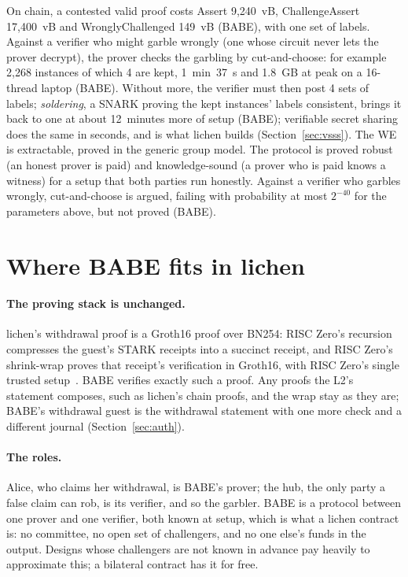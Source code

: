 \documentclass[11pt]{article}
\begin{document}
On chain, a contested valid proof costs Assert 9,240~vB, ChallengeAssert
17,400~vB and WronglyChallenged 149~vB (BABE), with one set of labels.
Against a verifier who might garble wrongly (one whose circuit never lets
the prover decrypt), the prover checks the garbling by cut-and-choose:
for example 2,268 instances of which 4 are kept, 1~min~37~s and 1.8~GB at
peak on a 16-thread laptop (BABE). Without more, the verifier must then
post 4 sets of labels; \emph{soldering}, a SNARK proving the kept
instances' labels consistent, brings it back to one at about 12~minutes
more of setup (BABE); verifiable secret sharing does the same in seconds,
and is what lichen builds (Section~\ref{sec:vsss}). The WE is
extractable, proved in the generic group model. The protocol is proved
robust (an honest prover is paid) and knowledge-sound (a prover who is
paid knows a witness) for a setup that both parties run honestly.
Against a verifier who garbles wrongly, cut-and-choose is argued,
failing with probability at most $2^{-40}$ for the parameters above, but
not proved (BABE).

\section{Where BABE fits in lichen}
\label{sec:fit}

\paragraph{The proving stack is unchanged.} lichen's withdrawal proof is
a Groth16 proof over BN254: RISC Zero's recursion compresses the guest's
STARK receipts into a succinct receipt, and RISC Zero's shrink-wrap
proves that receipt's verification in Groth16, with RISC Zero's single
trusted setup~\cite{risc0}. BABE verifies exactly such a proof. Any proofs
the L2's statement composes, such as lichen's chain proofs, and the wrap
stay as they are; BABE's withdrawal guest is the withdrawal statement
with one more check and a different journal (Section~\ref{sec:auth}).

\paragraph{The roles.} Alice, who claims her withdrawal, is BABE's
prover; the hub, the only party a false claim can rob, is its verifier,
and so the garbler. BABE is a protocol between one prover and one
verifier, both known at setup, which is what a lichen contract is: no
committee, no open set of challengers, and no one else's funds in the
output. Designs whose challengers are not known in advance pay heavily
to approximate this; a bilateral contract has it for free.
\end{document}
